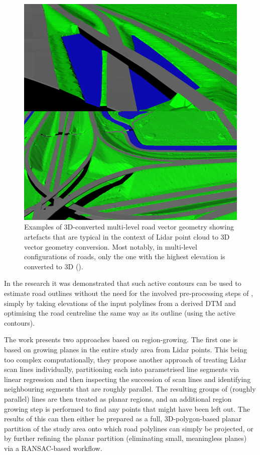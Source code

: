 \begin{figure}
    \includegraphics[width=\linewidth]{p2/figs/oudeElberink_vosselman_2006_03.png} 
    \caption{Examples of 3D-converted multi-level road vector geometry showing artefacts that are typical in the context of Lidar point cloud to 3D vector geometry conversion. Most notably, in multi-level configurations of roads, only the one with the highest elevation is converted to 3D (\cite{oudeElberink_vosselman_2006}).}
    \label{fig:conversionartefacts}
\end{figure}

In the research \cite{gopfert_etal_2011} it was demonstrated that such active contours can be used to estimate road outlines without the need for the involved pre-processing steps of \cite{boyko_funkhauser_2011}, simply by taking elevations of the input polylines from a derived DTM and optimising the road centreline the same way as its outline (using the active contours).

The work \cite{hatger_brenner_2003} presents two approaches based on region-growing. The first one is based on growing planes in the entire study area from Lidar points. This being too complex computationally, they propose another approach of treating Lidar scan lines individually, partitioning each into parametrised line segments via linear regression and then inspecting the succession of scan lines and identifying neighbouring segments that are roughly parallel. The resulting groups of (roughly parallel) lines are then treated as planar regions, and an additional region growing step is performed to find any points that might have been left out. The results of this can then either be prepared as a full, 3D-polygon-based planar partition of the study area onto which road polylines can simply be projected, or by further refining the planar partition (eliminating small, meaningless planes) via a RANSAC-based workflow.

